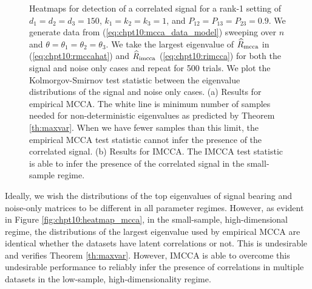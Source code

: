 \begin{figure}
  \begin{center}
    \caption{Heatmaps for detection of a correlated signal for a rank-1 setting of
      $d_1=d_2=d_3=150$, $k_1=k_2=k_3=1$, and $P_{12}=P_{13}=P_{23}=0.9$. We generate data
      from (\ref{eq:chpt10:mcca_data_model}) sweeping over $n$ and
      $\theta=\theta_1=\theta_2=\theta_3$. We take the largest eigenvalue of $\widehat{R}_{\text{mcca}}$
      in (\ref{eq:chpt10:rmccahat}) and $\widehat{R}_{\text{imcca}}$ (\ref{eq:chpt10:rimcca}) for both the
      signal and noise only cases and repeat for 500 trials. We plot the Kolmorgov-Smirnov
      test statistic between the eigenvalue distributions of the signal and noise only
      cases. (a) Results for empirical MCCA. The white line is minimum number of samples
      needed for non-deterministic eigenvalues as predicted by Theorem
      \ref{th:maxvar}. When we have fewer samples than this limit, the empirical MCCA test
      statistic cannot infer the presence of the correlated signal. (b) Results for
      IMCCA. The IMCCA test statistic is able to infer the presence of the correlated
      signal in the small-sample regime.}
    \label{fig:chpt10:heatmap}
  \end{center}
\end{figure}

Ideally, we wish the distributions of the top eigenvalues of signal bearing and noise-only
matrices to be different in all parameter regimes. However, as evident in Figure
\ref{fig:chpt10:heatmap_mcca}, in the small-sample, high-dimensional regime, the
distributions of the largest eigenvalue used by empirical MCCA are identical whether the
datasets have latent correlations or not. This is undesirable and verifies Theorem
\ref{th:maxvar}.  However, IMCCA is able to overcome this undesirable performance to
reliably infer the presence of correlations in multiple datasets in the low-sample,
high-dimensionality regime.

